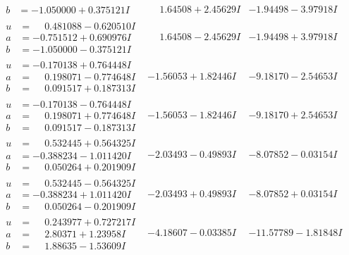 \documentclass[1p]{elsarticle_modified}
\theoremstyle{definition}
\begin{document}
$$\begin{array}{c|c|c}
\begin{aligned}
b &= -1.050000 + 0.375121 I\end{aligned}
 & \phantom{-}1.64508 + 2.45629 I & -1.94498 - 3.97918 I \\ \hline\begin{aligned}
u &= \phantom{-}0.481088 - 0.620510 I \\
a &= -0.751512 + 0.690976 I \\
b &= -1.050000 - 0.375121 I\end{aligned}
 & \phantom{-}1.64508 - 2.45629 I & -1.94498 + 3.97918 I \\ \hline\begin{aligned}
u &= -0.170138 + 0.764448 I \\
a &= \phantom{-}0.198071 - 0.774648 I \\
b &= \phantom{-}0.091517 + 0.187313 I\end{aligned}
 & -1.56053 + 1.82446 I & -9.18170 - 2.54653 I \\ \hline\begin{aligned}
u &= -0.170138 - 0.764448 I \\
a &= \phantom{-}0.198071 + 0.774648 I \\
b &= \phantom{-}0.091517 - 0.187313 I\end{aligned}
 & -1.56053 - 1.82446 I & -9.18170 + 2.54653 I \\ \hline\begin{aligned}
u &= \phantom{-}0.532445 + 0.564325 I \\
a &= -0.388234 - 1.011420 I \\
b &= \phantom{-}0.050264 + 0.201909 I\end{aligned}
 & -2.03493 - 0.49893 I & -8.07852 - 0.03154 I \\ \hline\begin{aligned}
u &= \phantom{-}0.532445 - 0.564325 I \\
a &= -0.388234 + 1.011420 I \\
b &= \phantom{-}0.050264 - 0.201909 I\end{aligned}
 & -2.03493 + 0.49893 I & -8.07852 + 0.03154 I \\ \hline\begin{aligned}
u &= \phantom{-}0.243977 + 0.727217 I \\
a &= \phantom{-}2.80371 + 1.23958 I \\
b &= \phantom{-}1.88635 - 1.53609 I\end{aligned}
 & -4.18607 - 0.03385 I & -11.57789 - 1.81848 I \\ \hline\begin{aligned}

\end{aligned}
\end{array}$$
\end{document}
